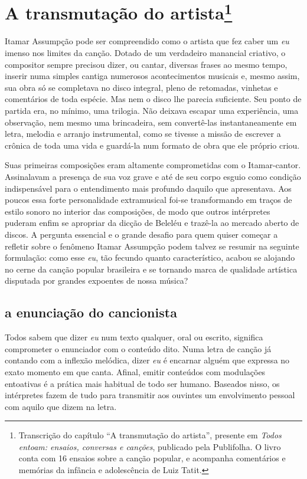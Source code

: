 
\chapter{A transmutação do artista\footnote{Transcrição do capítulo ``A transmutação do artista'', presente em \textit{Todos entoam: ensaios, conversas e canções}, publicado pela Publifolha. O livro conta com 16 ensaios sobre a canção popular, e acompanha comentários e memórias da infância e adolescência de Luiz Tatit.}}


Itamar Assumpção pode ser compreendido como o artista que fez caber um
\textit{eu} imenso nos limites da canção. Dotado de um verdadeiro manancial
criativo, o compositor sempre precisou dizer, ou cantar, diversas frases
ao mesmo tempo, inserir numa simples cantiga numerosos acontecimentos
musicais e, mesmo assim, sua obra só se completava no disco integral,
pleno de retomadas, vinhetas e comentários de toda espécie. Mas nem o
disco lhe parecia suficiente. Seu ponto de partida era, no mínimo, uma
trilogia. Não deixava escapar uma experiência, uma observação, nem mesmo
uma brincadeira, sem convertê-las instantaneamente em letra, melodia e
arranjo instrumental, como se tivesse a missão de escrever a crônica de
toda uma vida e guardá-la num formato de obra que ele próprio criou.

Suas primeiras composições eram altamente comprometidas com o
Itamar-cantor. Assinalavam a presença de sua voz grave e até de seu
corpo esguio como condição indispensável para o entendimento mais
profundo daquilo que apresentava. Aos poucos essa forte personalidade
extramusical foi-se transformando em traços de estilo sonoro no interior
das composições, de modo que outros intérpretes puderam enfim se
apropriar da dicção de Beleléu e trazê-la ao mercado aberto de discos. A
pergunta essencial e o grande desafio para quem quiser começar a
refletir sobre o fenômeno Itamar Assumpção podem talvez se resumir na
seguinte formulação: como esse \textit{eu}, tão fecundo quanto
característico, acabou se alojando no cerne da canção popular brasileira
e se tornando marca de qualidade artística disputada por grandes
expoentes de nossa música?

\section{a enunciação do cancionista}

Todos sabem que dizer \textit{eu} num texto qualquer, oral ou escrito,
significa comprometer o enunciador com o conteúdo dito. Numa letra de
canção já contando com a inflexão melódica, dizer \textit{eu} é encarnar
alguém que expressa no exato momento em que canta. Afinal, emitir
conteúdos com modulações entoativas é a prática mais habitual de todo
ser humano. Baseados nisso, os intérpretes fazem de tudo para transmitir
aos ouvintes um envolvimento pessoal com aquilo que dizem na letra.

